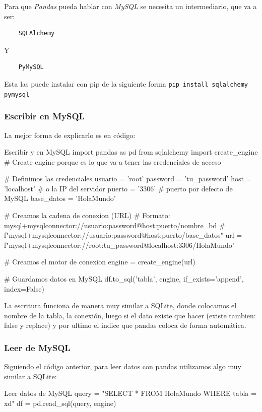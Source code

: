 Para que \textit{Pandas} pueda hablar con \textit{MySQL} se necesita un intermediario, que va a ser:
\begin{verbatim}
    SQLAlchemy
\end{verbatim}
Y 
\begin{verbatim}
    PyMySQL
\end{verbatim}

Esta las puede instalar con pip de la siguiente forma \texttt{pip install sqlalchemy pymysql}

\subsubsection{Escribir en MySQL}

La mejor forma de explicarlo es en código:
\begin{pycode}{Escribir y en MySQL}
import pandas as pd
from sqlalchemy import create_engine
# Create engine porque es lo que va a tener las credenciales de acceso

# Definimos las credenciales
usuario = 'root'
password = 'tu_password'
host = 'localhost'    # o la IP del servidor
puerto = '3306'       # puerto por defecto de MySQL
base_datos = 'HolaMundo'

# Creamos la cadena de conexion (URL)
# Formato: mysql+mysqlconnector://usuario:password@host:puerto/nombre_bd
# f"mysql+mysqlconnector://{usuario}:{password}@{host}:{puerto}/{base_datos}"
url = f"mysql+mysqlconnector://{root}:{tu_password}@{localhost}:{3306}/{HolaMundo}"

# Creamos el motor de conexion
engine = create_engine(url)

# Guardamos datos en MySQL
df.to_sql('tabla', engine, if_exists='append', index=False)

\end{pycode}

La escritura funciona de manera muy similar a SQLite, donde colocamos el nombre de la tabla, la conexión, luego si el dato existe que hacer (existe tambien: false y replace) y por ultimo el indice que pandas coloca de forma automática.

\subsubsection{Leer de MySQL}

Siguiendo el código anterior, para leer datos con pandas utilizamos algo muy similar a SQLite:
\begin{pycode}{Leer datos de MySQL}
query = "SELECT * FROM HolaMundo WHERE tabla = xd"
df = pd.read_sql(query, engine)
\end{pycode}



